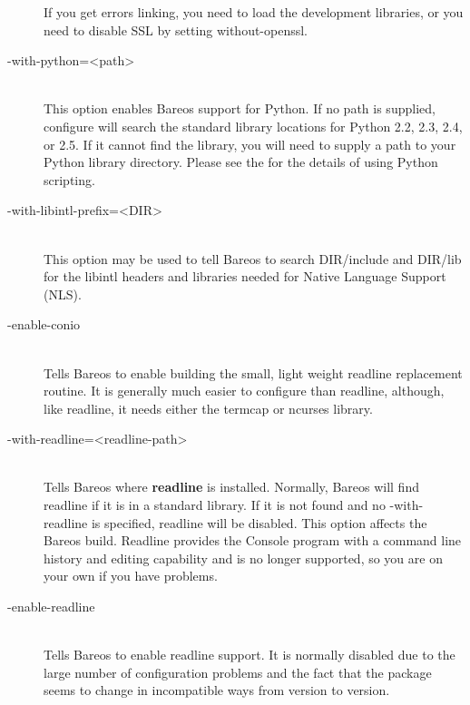\begin{description}
If you get errors linking, you need to load the development libraries,
or you need to disable SSL by setting without-openssl.

\item [ {-}{\-}with-python={\textless}path{\textgreater}] \hfill \\
This option enables Bareos support for Python.  If no path is supplied,
configure will search the standard library locations for Python 2.2,
2.3, 2.4, or 2.5.  If it cannot find the library, you will need to
supply a path to your Python library directory.  Please see the
 for the details of using Python
scripting.

\item [ {-}{\-}with-libintl-prefix={\textless}DIR{\textgreater}] \hfill \\
This option may be used to tell Bareos to search DIR/include and
DIR/lib for the libintl headers and libraries needed for Native
Language Support (NLS).

\item [ {-}{\-}enable-conio] \hfill \\
Tells Bareos to enable building the small, light weight readline
replacement routine.  It is generally much easier to configure than
readline, although, like readline, it needs either the termcap or
ncurses library.

\item [ {-}{\-}with-readline={\textless}readline-path{\textgreater}] \hfill \\
Tells Bareos where {\bf readline} is installed.  Normally, Bareos will
find readline if it is in a standard library.  If it is not found and no
{-}{\-}with-readline is specified, readline will be disabled.  This
option affects the Bareos build.  Readline provides the Console program
with a command line history and editing capability and is no longer
supported, so you are on your own if you have problems.

\item [ {-}{\-}enable-readline] \hfill \\
Tells Bareos to enable readline support.  It is normally disabled due to the
large number of configuration  problems and the fact that the package seems to
change in incompatible  ways from version to version.


\end{description}
